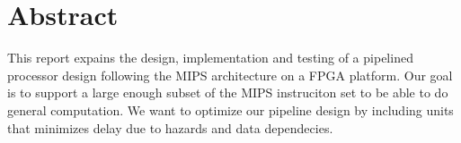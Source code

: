 \section{Abstract}

This report expains the design, implementation and testing of a pipelined
processor design following the MIPS architecture on a FPGA platform.
Our goal is to support a large enough subset of the MIPS instruciton set
to be able to do general computation. We want to optimize our pipeline design
by including units that minimizes delay due to hazards and data dependecies.
